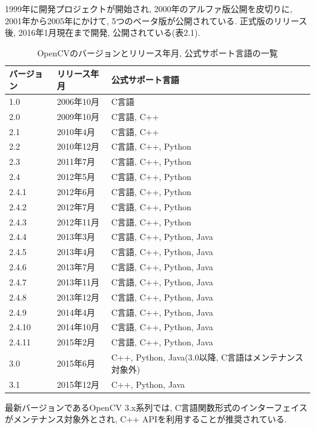 1999年に開発プロジェクトが開始され, 2000年のアルファ版公開を皮切りに, 2001年から2005年にかけて, 5つのベータ版が公開されている.
正式版のリリース後, 2016年1月現在まで開発, 公開されている(表2.1).

\begin{table}[tb]
\begin{center}
\begin{tabular}{|l|l|l|} \hline
バージョン & リリース年月 & 公式サポート言語 \\ \hline \hline
1.0 & 2006年10月 & C言語 \\ \hline
2.0 & 2009年10月 & C言語, C++ \\ \hline
2.1 & 2010年4月 & C言語, C++ \\ \hline
2.2 & 2010年12月 & C言語, C++, Python \\ \hline
2.3 & 2011年7月 & C言語, C++, Python \\ \hline
2.4 & 2012年5月 & C言語, C++, Python \\ \hline
2.4.1 & 2012年6月 & C言語, C++, Python \\ \hline
2.4.2 & 2012年7月 & C言語, C++, Python \\ \hline
2.4.3 & 2012年11月 & C言語, C++, Python \\ \hline
2.4.4 & 2013年3月 & C言語, C++, Python, Java \\ \hline
2.4.5 & 2013年4月 & C言語, C++, Python, Java \\ \hline
2.4.6 & 2013年7月 & C言語, C++, Python, Java \\ \hline
2.4.7 & 2013年11月 & C言語, C++, Python, Java \\ \hline
2.4.8 & 2013年12月 & C言語, C++, Python, Java \\ \hline
2.4.9 & 2014年4月 & C言語, C++, Python, Java \\ \hline
2.4.10 & 2014年10月 & C言語, C++, Python, Java \\ \hline
2.4.11 & 2015年2月 & C言語, C++, Python, Java \\ \hline
3.0 & 2015年6月 & C++, Python, Java(3.0以降, C言語はメンテナンス対象外) \\ \hline
3.1 & 2015年12月 & C++, Python, Java \\ \hline
\end{tabular}
\caption{OpenCVのバージョンとリリース年月, 公式サポート言語の一覧}
\end{center}
\end{table}

最新バージョンであるOpenCV 3.x系列では, C言語関数形式のインターフェイスがメンテナンス対象外とされ, C++ APIを利用することが推奨されている.

